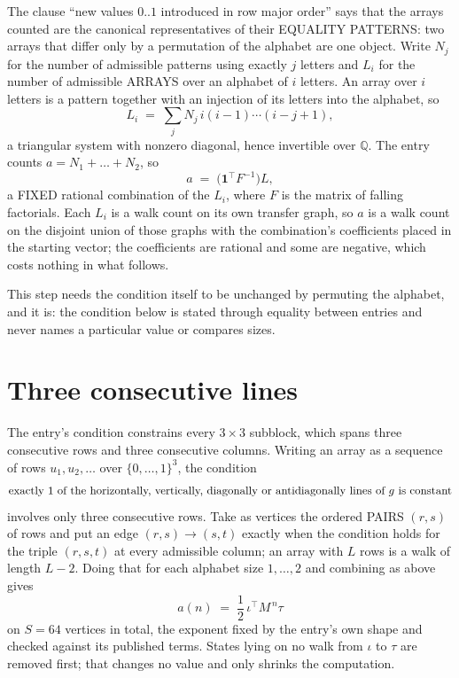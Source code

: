 \documentclass[11pt,a4paper]{article}
\theoremstyle{plain}
\theoremstyle{definition}
\begin{document}
The clause ``new values $0..1$ introduced in row major order'' says that the arrays
counted are the canonical representatives of their EQUALITY PATTERNS: two arrays that differ
only by a permutation of the alphabet are one object. Write $N_j$ for the number of admissible
patterns using exactly $j$ letters and $L_i$ for the number of admissible ARRAYS over an
alphabet of $i$ letters. An array over $i$ letters is a pattern together with an injection of
its letters into the alphabet, so
\[
L_i\;=\;\sum_{j}N_j\,i(i-1)\cdots(i-j+1),
\]
a triangular system with nonzero diagonal, hence invertible over $\mathbb{Q}$. The entry
counts $a=N_1+\dots+N_{2}$, so
\[
a\;=\;\bigl(\mathbf{1}^{\!\top}F^{-1}\bigr)L ,
\]
a FIXED rational combination of the $L_i$, where $F$ is the matrix of falling factorials.
Each $L_i$ is a walk count on its own transfer graph, so $a$ is a walk count on the disjoint
union of those graphs with the combination's coefficients placed in the starting vector; the
coefficients are rational and some are negative, which costs nothing in what follows.

This step needs the condition itself to be unchanged by permuting the alphabet, and it is:
the condition below is stated through equality between entries and never names a particular
value or compares sizes.

\section{Three consecutive lines}

The entry's condition constrains every $3\times3$ subblock, which spans three consecutive
rows and three consecutive columns. Writing an array as a sequence of rows
$u_1,u_2,\dots$ over $\{0,\dots,1\}^{3}$, the condition
\[
\text{exactly }1\text{ of the horizontally, vertically, diagonally or antidiagonally lines of }g\text{ \text{is constant}}
\]
involves only three consecutive rows. Take as vertices the ordered PAIRS $(r,s)$ of
rows and put an edge $(r,s)\to(s,t)$ exactly when the condition holds for the triple
$(r,s,t)$ at every admissible column; an array with $L$ rows is a walk of length $L-2$.
Doing that for each alphabet size $1,\dots,2$ and combining as above gives
\[
a(n)\;=\;\frac{1}{2}\,\iota^{\!\top}M^{\,n}\tau
\]
on $S=64$ vertices in total, the exponent fixed by the entry's own shape and checked against
its published terms. States lying on no walk from $\iota$ to $\tau$ are removed first; that
changes no value and only shrinks the computation.
\end{document}
